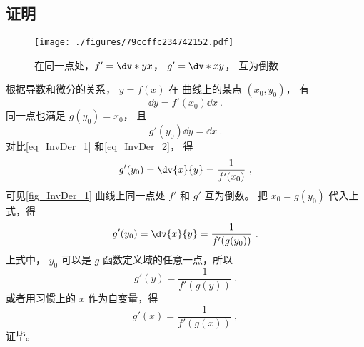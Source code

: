 \subsection{证明}
\begin{figure}[ht]
\centering
\texttt{[image: ./figures/79ccffc234742152.pdf]}
\caption{在同一点处，$f'=\dv*{y}{x}$， $g'=\dv*{x}{y}$， 互为倒数}\label{fig_InvDer_1}
\end{figure}
根据导数和微分的关系， $y = f(x)$ 在 曲线上的某点 $(x_0, y_0)$， 有
 \begin{equation}\label{eq_InvDer_1}
\dd{y} = f'(x_0) \dd{x}~.
\end{equation}
同一点也满足 $g(y_0) = x_0$， 且
 \begin{equation}\label{eq_InvDer_2}
g'(y_0)\dd{y} = \dd{x}~.
\end{equation}
对比\autoref{eq_InvDer_1} 和\autoref{eq_InvDer_2}， 得
\begin{equation}
g'(y_0) = \dv{x}{y} = \frac{1}{f'(x_0)}~,
\end{equation}
可见\autoref{fig_InvDer_1} 曲线上同一点处 $f'$ 和 $g'$ 互为倒数。 把 ${x_0} = g(y_0)$ 代入上式，得
\begin{equation}
g'(y_0) = \dv{x}{y} = \frac{1}{f'(g(y_0))}~.
\end{equation} 
上式中， $y_0$ 可以是 $g$ 函数定义域的任意一点，所以
\begin{equation}
g'(y) = \frac{1}{f'(g(y))}~.
\end{equation} 
或者用习惯上的 $x$ 作为自变量，得
\begin{equation}
g'(x) = \frac{1}{f'(g(x))}~,
\end{equation}
证毕。
















